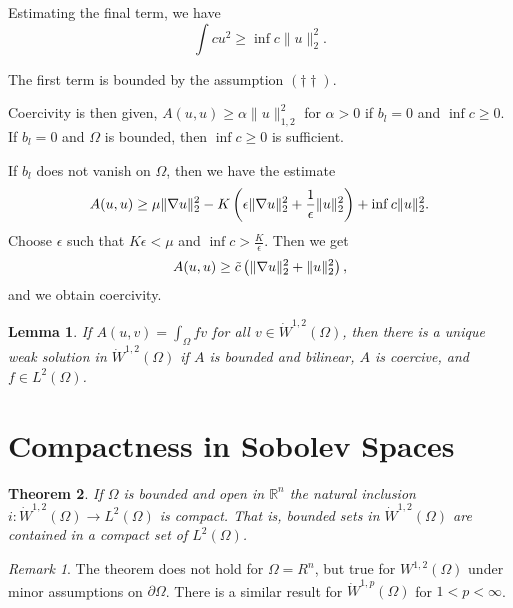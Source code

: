 \documentclass[10pt, oneside, reqno]{amsart}
\theoremstyle{plain}%
\newtheorem{thm}{Theorem}[section]
\newtheorem{lem}[thm]{Lemma}
\numberwithin{equation}{section}
\theoremstyle{definition}
\theoremstyle{remark}
\newtheorem*{rem}{Remark}
\newcommand{\R}{\mathbb{R}}
\begin{document}
Estimating the final term, we have \[
	\int c u^2 \geq \inf c \| u \|_2^2.
\]  

The first term is bounded by the assumption $(\dagger \dagger)$.

Coercivity is then given, $A(u, u) \geq \alpha \| u \|_{1, 2}^2$ for $\alpha > 0$ if $b_l = 0$ and $\inf c \geq 0$.  If $b_l = 0$ and $\Omega$ is bounded, then $\inf c \geq 0$ is sufficient. 

If $b_l$ does not vanish on $\Omega$, then we have the estimate \[
	A(u, u) \geq \mu \| \nabla u \|_2^2 - K \left( \epsilon \| \nabla u \|_2^2 + \frac{1}{\epsilon} \| u \|_2^2 \right) + \inf c \| u \|_2^2.
\]  Choose $\epsilon$ such that $K \epsilon < \mu$ and $\inf c > \frac{K}{\epsilon}$.  Then we get \[
	A(u, u) \geq \tilde c \left( \| \nabla u \|_2^2 + \| u \|_2^2 \right),
\] and we obtain coercivity.

\begin{lem}
	If $A(u, v) = \int_\Omega f v$ for all $v \in \dot W^{1, 2}(\Omega)$, then there is a unique weak solution in $\dot W^{1, 2}(\Omega)$ if $A$ is bounded and bilinear, $A$ is coercive, and $f \in L^2(\Omega)$. 
\end{lem}


\section{Compactness in Sobolev Spaces} %
\label{sec:compactness_in_sobolev_spaces}

\begin{thm}
	\label{thm:compactness_of_w12_inclusion}
	If $\Omega$ is bounded and open in $\R^n$ the natural inclusion $i: \dot W^{1, 2}(\Omega) \rightarrow L^2(\Omega)$ is compact.  That is, bounded sets in $\dot W^{1, 2}(\Omega)$ are contained in a compact set of $L^2(\Omega)$.  
\end{thm}

\begin{rem}
	The theorem does not hold for $\Omega = R^n$, but true for $W^{1, 2}(\Omega)$ under minor assumptions on $\partial \Omega$.  There is a similar result for $\dot W^{1, p}(\Omega)$ for $1 < p < \infty$.
\end{rem}
\end{document}
